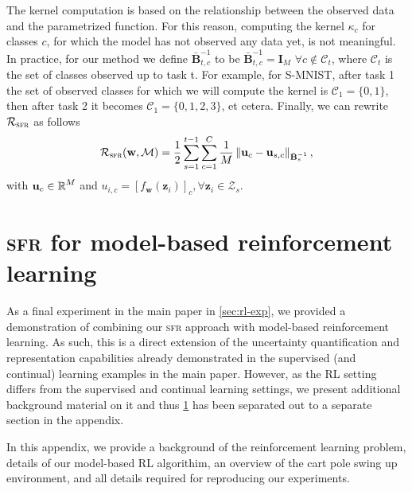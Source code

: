 \documentclass{article}
\newcommand{\our}{\textsc{sfr}\xspace}
\newcommand{\weights}{\ensuremath{\mathbf{w}}}
\newcommand{\mbf}[1]{\mathbf{#1}}
\newcommand{\MB}{\mbf{B}}
\newcommand{\MZ}{\mbf{Z}}
\newcommand{\MI}{\mbf{I}}
\newcommand{\vz}{\mbf{z}}
\newcommand{\vu}{\mbf{u}}
\begin{document}
The kernel computation is based on the relationship between the observed data and the parametrized function. For this reason, computing the kernel $\kappa_c$ for classes $c$, for which the model has not observed any data yet, is not meaningful.  
In practice, for our method we define $\bar{\MB}^{-1}_{t, c}$ to be $\bar{\MB}^{-1}_{t, c} = \MI_M$ $\forall c \not\in \mathcal{C}_t$, where $\mathcal{C}_t$ is the set of classes observed up to task t. For example, for S-MNIST, after task 1 the set of observed classes for which we will compute the kernel is $\mathcal{C}_1 = \{0, 1\}$, then after task 2 it becomes $\mathcal{C}_1 = \{0, 1, 2, 3\}$, et cetera. 
Finally, we can rewrite $\mathcal{R}_\mathrm{\our}$ as follows
\begin{equation}\label{eq-cl-regularizer}%
  \mathcal{R}_\mathrm{\our}(\weights, \mathcal{M}) = \frac{1}{2} \sum_{s=1}^{t-1} \sum_{c=1}^{C} \frac{1}{M} 
	\left\lVert 
	\vu_c - \vu_{s,c} %
	\right\rVert_{\bar{\MB}^{-1}_{s}},
\end{equation}
%
with $\vu_c \in \R^M$ and $u_{i, c} = \left[ f_{\weights}(\vz_{i}) \right]_c, \forall {\vz_i} \in \mathcal{Z}_s$.




\section{\our for model-based reinforcement learning}
\label{app:rl}
%
As a final experiment in the main paper in \cref{sec:rl-exp}, we provided a demonstration of combining our \our approach with model-based reinforcement learning. As such, this is a direct extension of the uncertainty quantification and representation capabilities already demonstrated in the supervised (and continual) learning examples in the main paper. However, as the RL setting differs from the supervised and continual learning settings, we present additional background material on it and thus \cref{app:rl} has been separated out to a separate section in the appendix.

In this appendix, we provide a background of the reinforcement learning problem, details of our
model-based RL algorithim, an overview of the cart pole swing up environment, and
all details required for reproducing our experiments.

\end{document}
